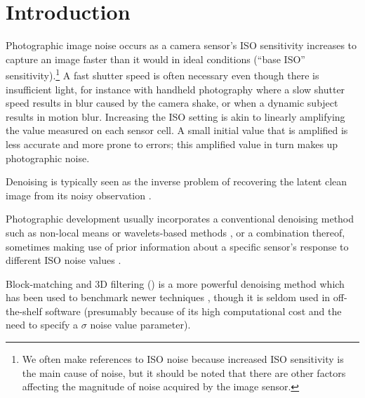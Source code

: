 \chapter{Introduction}\label{chap:Introduction}

Photographic image noise occurs as a camera sensor's ISO sensitivity increases to capture an image faster than it would in ideal conditions (``base ISO'' sensitivity).\footnote{We often make references to ISO noise because increased ISO sensitivity is the main cause of noise, but it should be noted that there are other factors affecting the magnitude of noise acquired by the image sensor.} A fast shutter speed is often necessary even though there is insufficient light, for instance with handheld photography where a slow shutter speed results in blur caused by the camera shake, or when a dynamic subject results in motion blur. Increasing the ISO setting is akin to linearly amplifying the value measured on each sensor cell. A small initial value that is amplified is less accurate and more prone to errors; this amplified value in turn makes up photographic noise. 

Denoising is typically seen as the inverse problem of recovering the latent clean image from its noisy observation \cite{rednet}. 

Photographic development usually incorporates a conventional denoising method such as non-local means \cite{nlm} or wavelets-based methods \cite{wavelets-denoising}, or a combination thereof, sometimes making use of prior information about a specific sensor's response to different ISO noise values \cite{darktable-denoising}.

Block-matching and 3D filtering \cite{bm3d} () is a more powerful denoising method which has been used to benchmark newer techniques \cite{nind-ntire}\cite{darmstadt}\cite{rednet}\cite{sidd}\cite{learningtoseeinthedark}\cite{renoir}\cite{noise2noise}\cite{dncnn}\cite{microscopynoise}\cite{lossescomp}, though it is seldom used in off-the-shelf software (presumably because of its high computational cost and the need to specify a $\sigma$ noise value parameter). 

